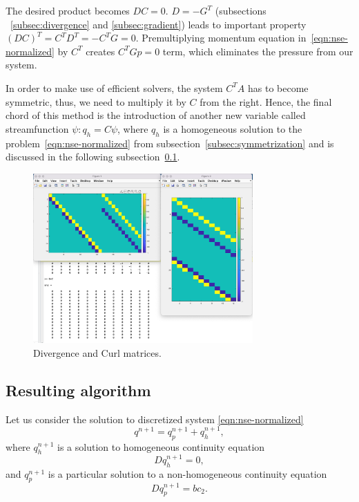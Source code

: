 \documentclass{article}
\begin{document}
The desired product becomes $DC=0$. $D=-G^T$ (subsections ~\ref{subsec:divergence} and \ref{subsec:gradient}) leads to important property $(DC)^T=C^TD^T=-C^TG=0$. Premultiplying momentum equation in~\eqref{eqn:nse-normalized} by $C^T$ creates $C^TGp=0$ term, which eliminates the pressure from our system.

In order to make use of efficient solvers, the system $C^TA$ has to become symmetric, thus, we need to multiply it by $C$ from the right. Hence, the final chord of this method is the introduction of another new variable called streamfunction $\psi:q_h=C\psi$, where $q_h$ is a homogeneous solution to the problem~\eqref{eqn:nse-normalized} from subsection~\ref{subsec:symmetrization} and is discussed in the following subsection~\ref{sec:algorithm}.

\begin{figure}
\begin{center}
  \includegraphics[width=0.75\textwidth]{Figures/D-C-DC}
\end{center}
\caption{Divergence and Curl matrices.}
\label{fig:DC}
\end{figure}


\subsection{Resulting algorithm}\label{sec:algorithm}

Let us consider the solution to discretized system \eqref{eqn:nse-normalized}
\begin{equation}
	q^{n+1}=q^{n+1}_p+q^{n+1}_h,
\end{equation}
where $q^{n+1}_h$ is a solution to homogeneous continuity equation 
\begin{equation}\label{eqn:discrete-homogeneous-continuity}
	Dq^{n+1}_h=0,
\end{equation}
and $q^{n+1}_p$ is a particular solution to a non-homogeneous continuity equation
\begin{equation}\label{eqn:discrete-non-homogeneous-continuity}
	Dq^{n+1}_p=bc_2.
\end{equation}
\end{document}
